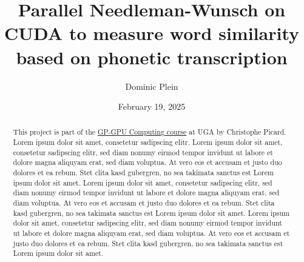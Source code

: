 \documentclass[10pt,a4paper,english]{article}
\title{\vspace{-0.0em}Parallel Needleman-Wunsch on CUDA to measure word similarity based on phonetic transcription}
\author{Dominic Plein}
\date{February 19, 2025}
\newcommand{\abstractText}{\noindent
	\newline\noindent
	This project is part of the \href{https://membres-ljk.imag.fr/Christophe.Picard/teaching/gp-gpu}{GP-GPU Computing course} at UGA by Christophe Picard.
    Lorem ipsum dolor sit amet, consetetur sadipscing elitr.
    Lorem ipsum dolor sit amet, consetetur sadipscing elitr, sed diam nonumy eirmod tempor invidunt ut labore et dolore magna aliquyam erat, sed diam voluptua. At vero eos et accusam et justo duo dolores et ea rebum. Stet clita kasd gubergren, no sea takimata sanctus est Lorem ipsum dolor sit amet. Lorem ipsum dolor sit amet, consetetur sadipscing elitr, sed diam nonumy eirmod tempor invidunt ut labore et dolore magna aliquyam erat, sed diam voluptua. At vero eos et accusam et justo duo dolores et ea rebum. Stet clita kasd gubergren, no sea takimata sanctus est Lorem ipsum dolor sit amet. Lorem ipsum dolor sit amet, consetetur sadipscing elitr, sed diam nonumy eirmod tempor invidunt ut labore et dolore magna aliquyam erat, sed diam voluptua. At vero eos et accusam et justo duo dolores et ea rebum. Stet clita kasd gubergren, no sea takimata sanctus est Lorem ipsum dolor sit amet.
}
\begin{document}
\setlength{\abovedisplayskip}{0.2em}

\maketitle
\begin{abstract}
    \abstractText
    \newline
    \newline
\end{abstract}



\begin{multicols*}{2}
\tableofcontents

\newcolumn




% 
\end{multicols*}

\printglossary[type=\acronymtype]
\end{document}
